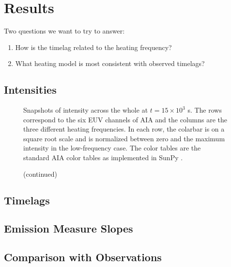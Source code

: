 \section{Results}\label{results}

Two questions we want to try to answer:
\begin{enumerate}
    \item How is the timelag related to the heating frequency?
    \item What heating model is most consistent with observed timelags?
\end{enumerate}

\subsection{Intensities}

\begin{figure*}[!b]
    \caption{Snapshots of intensity across the whole \AR at $t=15\times10^3$ s. The rows correspond to the six EUV channels of AIA and the columns are the three different heating frequencies. In each row, the colarbar is on a square root scale and is normalized between zero and the maximum intensity in the low-frequency case. The color tables are the standard AIA color tables as implemented in SunPy \citep{sunpy_community_sunpypython_2015}.}
    \label{fig:intensity_map}
\end{figure*}
\begin{figure*}[!t]
    \figurenum{\ref*{fig:intensity_map}}
    \caption{(continued)}
\end{figure*}



\subsection{Timelags}

\subsection{Emission Measure Slopes}

\subsection{Comparison with Observations}\label{compare_obs}



